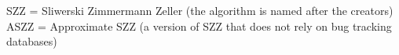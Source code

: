 \documentclass[../main.tex]{subfiles}
\begin{document}
SZZ = Sliwerski Zimmermann Zeller (the algorithm is named after the creators)
ASZZ = Approximate SZZ (a version of SZZ that does not rely on bug tracking databases)
\end{document}
